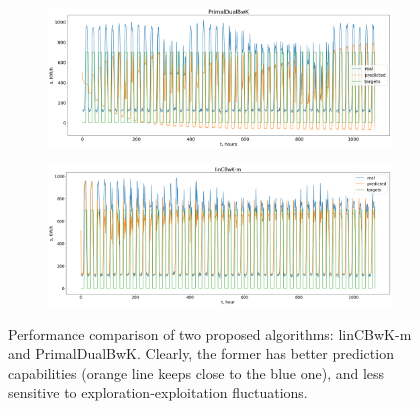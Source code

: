 \begin{figure}
\centering
\begin{subfigure}{1.1\textwidth}
    \label{fig:pdbwk_performance}
    \centering
    \includegraphics[width=1\textwidth]{figures/pdbwk_consumption}
\end{subfigure}
\begin{subfigure}{1.1\textwidth}
    \label{fig:lincbwk_performance}
    \centering
    \includegraphics[width=1\textwidth]{figures/lincbwk_consumption}
\end{subfigure}
\caption{Performance comparison of two proposed algorithms: linCBwK-m and PrimalDualBwK. Clearly, the former has better prediction capabilities (orange line keeps close to the blue one), and less sensitive to exploration-exploitation fluctuations.}
\label{fig:performances}
\end{figure}


